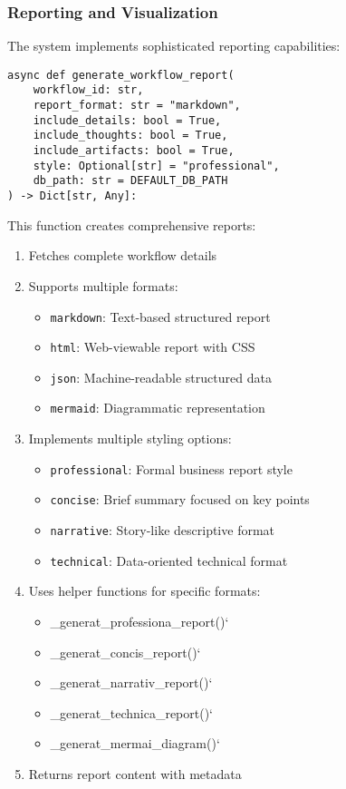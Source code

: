 \documentclass[12pt,a4paper]{article}
\newcommand{\code}[1]{\texttt{#1}}
\begin{document}
\subsubsection*{Reporting and Visualization}

The system implements sophisticated reporting capabilities:
\begin{pageablecode}
\begin{verbatim}
async def generate_workflow_report(
    workflow_id: str,
    report_format: str = "markdown",
    include_details: bool = True,
    include_thoughts: bool = True,
    include_artifacts: bool = True,
    style: Optional[str] = "professional",
    db_path: str = DEFAULT_DB_PATH
) -> Dict[str, Any]:
\end{verbatim}
\end{pageablecode}
This function creates comprehensive reports:
\begin{enumerate}[label=\arabic*.]
    \item Fetches complete workflow details
    \item Supports multiple formats:
    \begin{itemize}
        \item \code{markdown}: Text-based structured report
        \item \code{html}: Web-viewable report with CSS
        \item \code{json}: Machine-readable structured data
        \item \code{mermaid}: Diagrammatic representation
    \end{itemize}
    \item Implements multiple styling options:
    \begin{itemize}
        \item \code{professional}: Formal business report style
        \item \code{concise}: Brief summary focused on key points
        \item \code{narrative}: Story-like descriptive format
        \item \code{technical}: Data-oriented technical format
    \end{itemize}
    \item Uses helper functions for specific formats:
    \begin{itemize}
        \item \1\_generat\1\_professiona\1\_report()`
        \item \1\_generat\1\_concis\1\_report()`
        \item \1\_generat\1\_narrativ\1\_report()`
        \item \1\_generat\1\_technica\1\_report()`
        \item \1\_generat\1\_mermai\1\_diagram()`
    \end{itemize}
    \item Returns report content with metadata
\end{enumerate}
\end{document}
